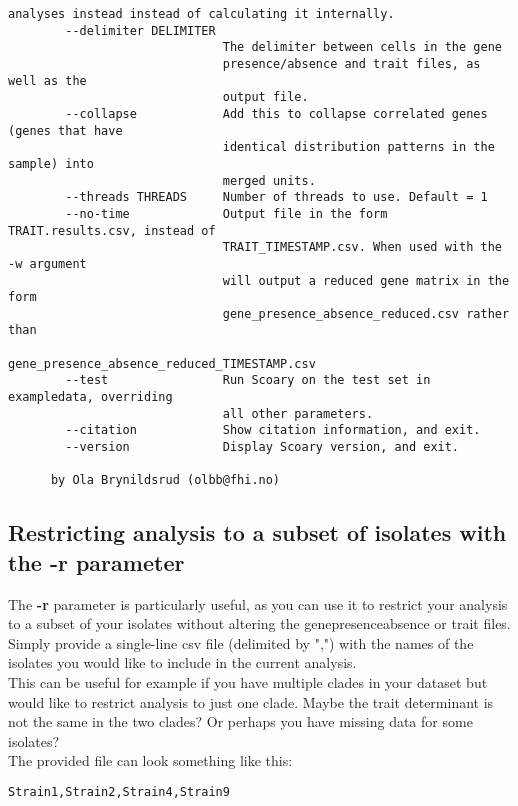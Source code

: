 \documentclass{article}
\begin{document}
\begin{lstlisting}[basicstyle=\fontsize{6}{11}\ttfamily,breaklines]
                              analyses instead instead of calculating it internally.
        --delimiter DELIMITER
                              The delimiter between cells in the gene
                              presence/absence and trait files, as well as the
                              output file.
        --collapse            Add this to collapse correlated genes (genes that have
                              identical distribution patterns in the sample) into
                              merged units.
        --threads THREADS     Number of threads to use. Default = 1
        --no-time             Output file in the form TRAIT.results.csv, instead of
                              TRAIT_TIMESTAMP.csv. When used with the -w argument
                              will output a reduced gene matrix in the form
                              gene_presence_absence_reduced.csv rather than
                              gene_presence_absence_reduced_TIMESTAMP.csv
        --test                Run Scoary on the test set in exampledata, overriding
                              all other parameters.
        --citation            Show citation information, and exit.
        --version             Display Scoary version, and exit.

      by Ola Brynildsrud (olbb@fhi.no)
    \end{lstlisting}

    \subsection{Restricting analysis to a subset of isolates with the -r parameter}
      The \textbf{-r} parameter is particularly useful, as you can use it to restrict your analysis to a subset of your isolates without altering the gene\textunderscore presence\textunderscore absence or trait files. Simply provide a single-line csv file (delimited by ",") with the names of the isolates you would like to include in the current analysis.\\

      This can be useful for example if you have multiple clades in your dataset but would like to restrict analysis to just one clade. Maybe the trait determinant is not the same in the two clades? Or perhaps you have missing data for some isolates?\\

      The provided file can look something like this:\\

      \begin{lstlisting}[language=bash]
        Strain1,Strain2,Strain4,Strain9
      \end{lstlisting}
\end{document}
